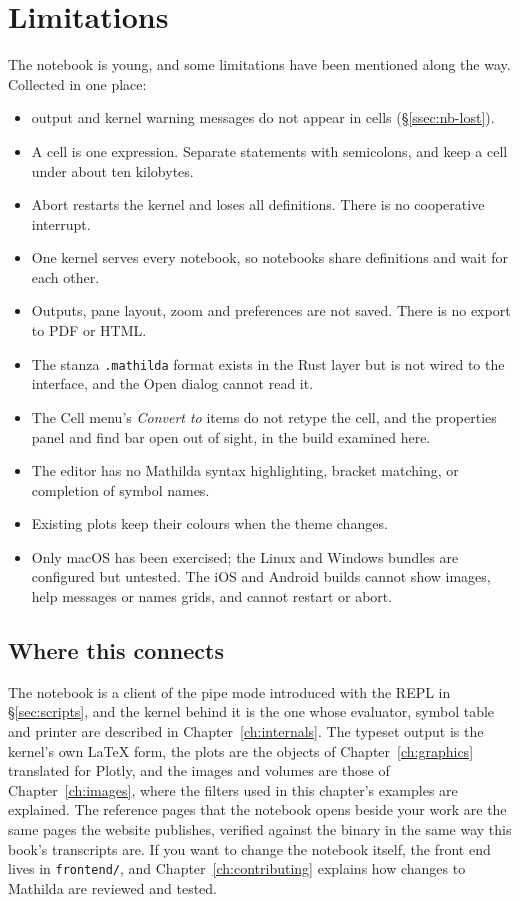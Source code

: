 \section{Limitations}
\label{sec:nb-limits}

The notebook is young, and some limitations have been mentioned along the
way. Collected in one place:

\begin{itemize}
\item {} output and kernel warning messages do not appear in cells
  (\S\ref{ssec:nb-lost}).
\item A cell is one expression. Separate statements with semicolons, and keep
  a cell under about ten kilobytes.
\item Abort restarts the kernel and loses all definitions. There is no
  cooperative interrupt.
\item One kernel serves every notebook, so notebooks share definitions and
  wait for each other.
\item Outputs, pane layout, zoom and preferences are not saved. There is no
  export to PDF or HTML.
\item The stanza \texttt{.mathilda} format exists in the Rust layer but is not
  wired to the interface, and the Open dialog cannot read it.
\item The Cell menu's \emph{Convert to} items do not retype the cell, and the
  properties panel and find bar open out of sight, in the build examined here.
\item The editor has no Mathilda syntax highlighting, bracket matching, or
  completion of symbol names.
\item Existing plots keep their colours when the theme changes.
\item Only macOS has been exercised; the Linux and Windows bundles are
  configured but untested. The iOS and Android builds cannot show images,
  help messages or names grids, and cannot restart or abort.
\end{itemize}

\subsection*{Where this connects}

The notebook is a client of the pipe mode introduced with the REPL in
\S\ref{sec:scripts}, and the kernel behind it is the one whose evaluator,
symbol table and printer are described in Chapter~\ref{ch:internals}. The
typeset output is the kernel's own \LaTeX{} form, the plots are the
 objects of Chapter~\ref{ch:graphics} translated for Plotly,
and the images and volumes are those of Chapter~\ref{ch:images}, where the
filters used in this chapter's examples are explained. The reference pages
that the notebook opens beside your work are the same pages the website
publishes, verified against the binary in the same way this book's
transcripts are. If you want to change the notebook itself, the front end
lives in \texttt{frontend/}, and Chapter~\ref{ch:contributing} explains how
changes to Mathilda are reviewed and tested.
